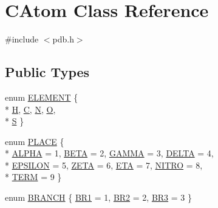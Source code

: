\hypertarget{classCAtom}{\section{C\-Atom Class Reference}
\label{classCAtom}
}


{\ttfamily \#include $<$pdb.\-h$>$}

\subsection*{Public Types}
\begin{DoxyCompactItemize}
\item 
enum \hyperlink{classCAtom_a79e729b143961179c43939392d704848}{E\-L\-E\-M\-E\-N\-T} \{ \\*
\hyperlink{classCAtom_a79e729b143961179c43939392d704848abf99f6f070bd255d3d610b6ec34f13b2}{H}, 
\hyperlink{classCAtom_a79e729b143961179c43939392d704848a6e700b53b49716ee00aa07e562cd7f43}{C}, 
\hyperlink{classCAtom_a79e729b143961179c43939392d704848ad8dcecc0b02940db05ebb15dd382a225}{N}, 
\hyperlink{classCAtom_a79e729b143961179c43939392d704848a5031f6d781302d5217fa84699f5a6439}{O}, 
\\*
\hyperlink{classCAtom_a79e729b143961179c43939392d704848a2fedd9d99a80c0ce9141da1e46aec6c2}{S}
 \}
\item 
enum \hyperlink{classCAtom_a1a65c02a5c158f4de46b2f09aca927d9}{P\-L\-A\-C\-E} \{ \\*
\hyperlink{classCAtom_a1a65c02a5c158f4de46b2f09aca927d9aad7b6332fea08a5789f1f19ea460dd26}{A\-L\-P\-H\-A} =  1, 
\hyperlink{classCAtom_a1a65c02a5c158f4de46b2f09aca927d9a23163e44dfb093c96e3cb25d46b0f3f5}{B\-E\-T\-A} =  2, 
\hyperlink{classCAtom_a1a65c02a5c158f4de46b2f09aca927d9a4d739e0e596e996f279020c74910c9f1}{G\-A\-M\-M\-A} =  3, 
\hyperlink{classCAtom_a1a65c02a5c158f4de46b2f09aca927d9a41e1c786994c3f1bfc8003bab4e3b81c}{D\-E\-L\-T\-A} =  4, 
\\*
\hyperlink{classCAtom_a1a65c02a5c158f4de46b2f09aca927d9a942f75b14dd49c66e6435213b6c4b226}{E\-P\-S\-I\-L\-O\-N} =  5, 
\hyperlink{classCAtom_a1a65c02a5c158f4de46b2f09aca927d9a8ea52803809a1326435b2afae54644e8}{Z\-E\-T\-A} =  6, 
\hyperlink{classCAtom_a1a65c02a5c158f4de46b2f09aca927d9aa1363abbf67695b4952e95201b2c4e3c}{E\-T\-A} =  7, 
\hyperlink{classCAtom_a1a65c02a5c158f4de46b2f09aca927d9ab284bdb8f4606f7afd759511b961e3b1}{N\-I\-T\-R\-O} =  8, 
\\*
\hyperlink{classCAtom_a1a65c02a5c158f4de46b2f09aca927d9abb497da96be0e90f8e8e287cbfcebd63}{T\-E\-R\-M} =  9
 \}
\item 
enum \hyperlink{classCAtom_a59319a3892af30a3b184bcd0c407a273}{B\-R\-A\-N\-C\-H} \{ \hyperlink{classCAtom_a59319a3892af30a3b184bcd0c407a273a8f61dc1646c6d790eb50c727d454c4e9}{B\-R1} =  1, 
\hyperlink{classCAtom_a59319a3892af30a3b184bcd0c407a273a3fe98bcd10670b758a0515ff4bf8bd07}{B\-R2} =  2, 
\hyperlink{classCAtom_a59319a3892af30a3b184bcd0c407a273ac5ba63a26ac3523f677471e9b33058d2}{B\-R3} =  3
 \}
\end{DoxyCompactItemize}
